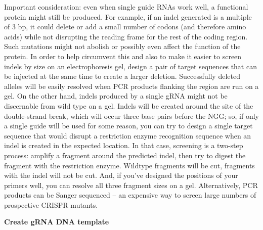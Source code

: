 \documentclass[
  letterpaper,
  DIV=11,
  numbers=noendperiod]{scrreprt}
\begin{document}
\begin{tcolorbox}[enhanced jigsaw, rightrule=.15mm, title=\textcolor{quarto-callout-note-color}{\faInfo}\hspace{0.5em}{Important Consideration}, titlerule=0mm, opacitybacktitle=0.6, toprule=.15mm, bottomrule=.15mm, opacityback=0, left=2mm, colframe=quarto-callout-note-color-frame, breakable, coltitle=black, colback=white, colbacktitle=quarto-callout-note-color!10!white, bottomtitle=1mm, leftrule=.75mm, toptitle=1mm, arc=.35mm]

Important consideration: even when single guide RNAs work well, a
functional protein might still be produced. For example, if an indel
generated is a multiple of 3 bp, it could delete or add a small number
of codons (and therefore amino acids) while not disrupting the reading
frame for the rest of the coding region. Such mutations might not
abolish or possibly even affect the function of the protein. In order to
help circumvent this and also to make it easier to screen indels by size
on an electrophoresis gel, design a pair of target sequences that can be
injected at the same time to create a larger deletion. Successfully
deleted alleles will be easily resolved when PCR products flanking the
region are run on a gel. On the other hand, indels produced by a single
gRNA might not be discernable from wild type on a gel. Indels will be
created around the site of the double-strand break, which will occur
three base pairs before the NGG; so, if only a single guide will be used
for some reason, you can try to design a single target sequence that
would disrupt a restriction enzyme recognition sequence when an indel is
created in the expected location. In that case, screening is a two-step
process: amplify a fragment around the predicted indel, then try to
digest the fragment with the restriction enzyme. Wildtype fragments will
be cut, fragments with the indel will not be cut. And, if you've
designed the positions of your primers well, you can resolve all three
fragment sizes on a gel. Alternatively, PCR products can be Sanger
sequenced -- an expensive way to screen large numbers of prospective
CRISPR mutants.

\end{tcolorbox}

\textbf{Create gRNA DNA template}
\end{document}
